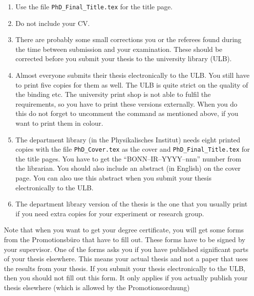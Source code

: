 \begin{enumerate}
\item Use the file \texttt{PhD\_Final\_Title.tex} for the title page.
\item Do not include your CV.
\item There are probably some small corrections you or the referees
  found during the time between submission and your examination. These
  should be corrected before you submit your thesis to the university
  library (ULB).
\item Almost everyone submits their thesis electronically to the
  ULB. You still have to print five copies for them as well. The ULB is
  quite strict on the quality of the binding etc. The university
  print shop is not able to fulfil the requirements, so you have to print
  these versions externally. When you do this do not forget to
  uncomment the  command as mentioned above, if you
  want to print them in colour.
\item The department
  library (in the Physikalisches
  Institut) needs eight printed copies with the file
  \texttt{PhD\_Cover.tex} as the cover and
  \texttt{PhD\_Final\_Title.tex} for the title pages. You have to get
  the \enquote{BONN--IR--YYYY--nnn} number from the librarian. You
  should also include an abstract (in English) on the cover page. You
  can also use this abstract when you submit your thesis
  electronically to the ULB.
\item The department library version of the thesis is the one that you usually print if
  you need extra copies for your experiment or research group.
\end{enumerate}

Note that when you want to get your degree certificate, you will get
some forms from the \foreignlanguage{ngerman}{Promotionsbüro} that have
to fill out. These forms have to be signed by your supervisor. One of
the forms asks you if you have published significant parts of your
thesis elsewhere. This means your actual thesis and not a paper that
uses the results from your thesis. If you submit your thesis
electronically to the ULB, then you should not fill out this form. It
only applies if you actually publish your thesis elsewhere (which is
allowed by the \foreignlanguage{ngerman}{Promotionsordnung})

